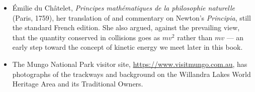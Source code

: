 \documentclass[11pt,twoside,openany]{book}
\begin{document}
\begin{itemize}[itemsep=3pt]
  \item \'Emilie du Ch\^atelet, \emph{Principes math\'ematiques de la philosophie naturelle} (Paris, 1759), her translation of and commentary on Newton's \emph{Principia}, still the standard French edition. She also argued, against the prevailing view, that the quantity conserved in collisions goes as $mv^2$ rather than $mv$ --- an early step toward the concept of kinetic energy we meet later in this book.
  \item The Mungo National Park visitor site, \url{https://www.visitmungo.com.au}, has photographs of the trackways and background on the Willandra Lakes World Heritage Area and its Traditional Owners.
\end{itemize}
\end{document}
